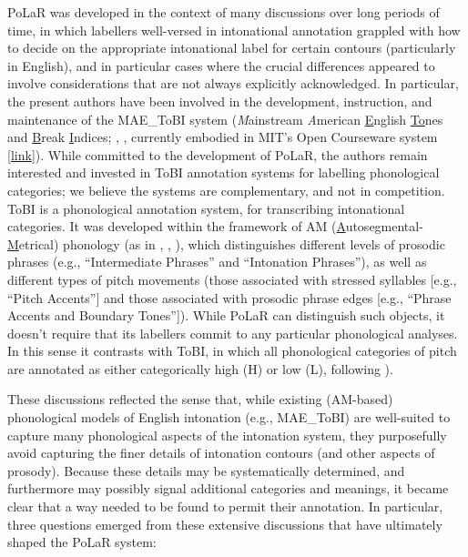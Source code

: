 \documentclass[11pt, twoside]{memoir}
\begin{document}
PoLaR was developed in the context of many discussions over long periods of time, in which labellers well-versed in intonational annotation grappled with how to decide on the appropriate intonational label for certain contours (particularly in English), and in particular cases where the crucial differences appeared to involve considerations that are not always explicitly acknowledged. 
%
{In particular, the present authors have been involved in the development, instruction, and maintenance of the MAE\_ToBI system (\textit{M}ainstream \textit{A}merican \uline{E}nglish \uline{To}nes and \uline{B}reak \uline{I}ndices; \citealt{beckmanhirschberg94}, \citealt{beckmanayers97}, \citealt{beckman-05} currently embodied in MIT’s Open Courseware system [\href{https://ocw.mit.edu/courses/electrical-engineering-and-computer-science/6-911-transcribing-prosodic-structure-of-spoken-utterances-with-tobi-january-iap-2006/}{link}]). While committed to the development of PoLaR, the authors remain interested and invested in ToBI annotation systems for labelling phonological categories; we believe the systems are complementary, and not in competition. ToBI is a phonological annotation system, for transcribing intonational categories. It was developed within the framework of AM (\uline{A}utosegmental-\uline{M}etrical) phonology (as in \citealt{pierrehumbert80}, \citealt{ladd08}, \citealt{arvanitifletcher20}), which distinguishes different levels of prosodic phrases (e.g., “Intermediate Phrases” and “Intonation Phrases”), as well as different types of pitch movements (those associated with stressed syllables [e.g., “Pitch Accents”] and those associated with prosodic phrase edges [e.g., “Phrase Accents and Boundary Tones”]). While PoLaR can distinguish such objects, it doesn’t require that its labellers commit to any particular phonological analyses. In this sense it contrasts with ToBI, in which all phonological categories of pitch are annotated as either categorically high (H) or low (L), following \citealt{pierrehumbert80}).}

These discussions reflected the sense that, while existing (AM-based) phonological models of English intonation (e.g., MAE\_ToBI) are well-suited to capture many phonological aspects of the intonation system, they purposefully avoid capturing the finer details of intonation contours (and other aspects of prosody).  Because these details may be systematically determined, and furthermore may possibly signal additional categories and meanings, it became clear that a way needed to be found to permit their annotation. In particular, three questions emerged from these extensive discussions that have ultimately shaped the PoLaR system:
\end{document}
